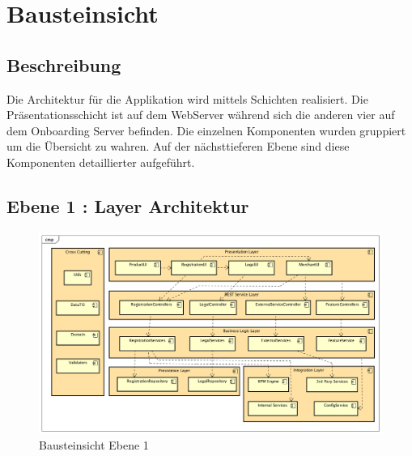 \graphicspath{{./images/}}

\chapter{Bausteinsicht}

\section{Beschreibung}

Die Architektur für die Applikation wird mittels Schichten realisiert. Die Präsentationsschicht ist auf dem WebServer während sich die anderen vier auf dem Onboarding Server befinden. Die einzelnen Komponenten wurden gruppiert um die Übersicht zu wahren. Auf der nächsttieferen Ebene sind diese Komponenten detaillierter aufgeführt.

\begin{landscape}
\section{Ebene 1 : Layer Architektur}

\begin{figure}[H]
	\centering
	\includegraphics[scale=0.6]{ComponentLevel1.png}
	\caption{Bausteinsicht Ebene 1}
\end{figure}

\end{landscape}
\restoregeometry

